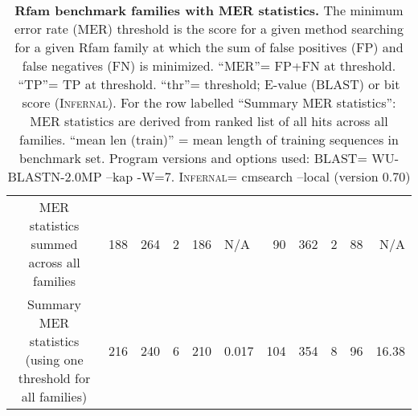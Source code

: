 \begin{table}
\begin{center}
\begin{tabular}{|ll|rrr|rrrrl|rrrrr|}
\multicolumn{5}{|c|}{MER statistics summed across all families} & 188
& 264 & 2 & 186 & N/A & 90 & 362 & 2 & 88 & N/A \\  
\multicolumn{5}{|c|}{Summary MER statistics (using one threshold for
all families)} & 216 & 240 & 6 & 210 &  0.017 & 104 & 354 & 8 & 96 &  16.38 \\ \hline 
\end{tabular}
\end{center}

\caption{\textbf{Rfam benchmark families with MER statistics.}
  The minimum error rate (MER) threshold is the score for a given
  method searching for a given Rfam family at which the sum of false
  positives (FP) and false negatives (FN) is
  minimized. ``MER''= FP+FN at threshold. ``TP''= TP at
  threshold. ``thr''= threshold; E-value (\textsc{BLAST}) or bit score
  (\textsc{Infernal}). For the row labelled
  ``Summary MER statistics'': MER statistics are derived from ranked list
  of all hits across all families. ``mean len (train)'' = mean length
  of training sequences in benchmark set. 
  Program versions and options used: \textsc{BLAST}=
  WU-BLASTN-2.0MP --kap -W=7. \textsc{Infernal}= cmsearch
  --local (version 0.70)}

\label{tbl:rmarkmer_fam}
\end{table}
